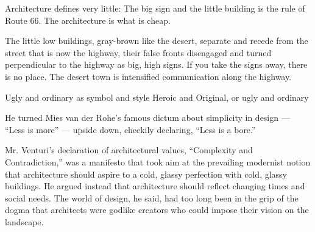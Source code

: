     Architecture defines very little: The big sign and the little building is the rule of Route 66.
    The architecture is what is cheap.\cite{Venturi1972}



    The little low buildings, gray-brown like the desert, separate and recede from the street that is now the highway, their false fronts disengaged and turned perpendicular to the highway as big, high signs.
    If you take the signs away, there is no place.
    The desert town is intensified communication along the highway.\cite{Venturi1972}

    Ugly and ordinary as symbol and style
    Heroic and Original, or ugly and ordinary


    He turned Mies van der Rohe’s famous dictum about simplicity in design — “Less is more” — upside down, cheekily declaring, “Less is a bore.”\cite{Schudel2018}

    Mr. Venturi’s declaration of architectural values, “Complexity and Contradiction,” was a manifesto that took aim at the prevailing modernist notion that architecture should aspire to a cold, glassy perfection with cold, glassy buildings.
    He argued instead that architecture should reflect changing times and social needs.
    The world of design, he said, had too long been in the grip of the dogma that architects were godlike creators who could impose their vision on the landscape.\cite{Schudel2018}

